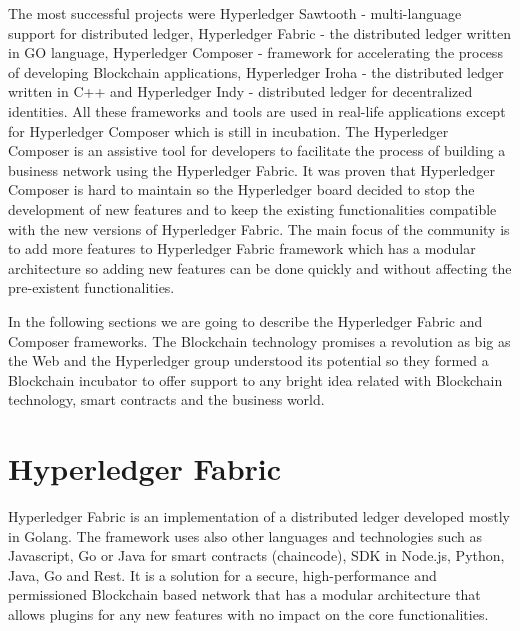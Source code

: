 The most successful projects were Hyperledger Sawtooth - multi-language support for distributed ledger, Hyperledger Fabric - the distributed ledger written in GO language, Hyperledger Composer - framework for accelerating the process of developing Blockchain applications, Hyperledger Iroha - the distributed ledger written in C++ and Hyperledger Indy - distributed ledger for decentralized identities.
All these frameworks and tools are used in real-life applications except for Hyperledger Composer which is still in incubation. The Hyperledger Composer is an assistive tool for developers to facilitate the process of building a business network using the Hyperledger Fabric. 
It was proven that Hyperledger Composer is hard to maintain so the Hyperledger board decided to stop the development of new features and to keep the existing functionalities compatible with the new versions of Hyperledger Fabric.
The main focus of the community is to add more features to Hyperledger Fabric framework which has a modular architecture so adding new features can be done quickly and without affecting the pre-existent functionalities.

In the following sections we are going to describe the Hyperledger Fabric and Composer frameworks. The Blockchain technology promises a revolution as big as the Web and the Hyperledger group understood its potential so they formed a Blockchain incubator to offer support to any bright idea related with Blockchain technology, smart contracts and the business world.

\section{Hyperledger Fabric}
\label{sub-sec:chapter1-section2}

\iffalse
\subsection{General aspects}
\label{sub-sec:chapter1-subsection1}
\fi
Hyperledger Fabric is an implementation of a distributed ledger developed mostly in Golang. The framework uses also other languages and technologies such as Javascript, Go or Java for smart contracts (chaincode), SDK in Node.js, Python, Java, Go and Rest.
It is a solution for a secure, high-performance and permissioned Blockchain based network that has a modular architecture that allows plugins for any new features with no impact on the core functionalities.

